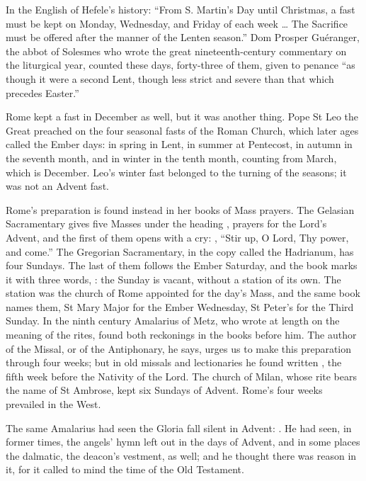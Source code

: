 \noindent In the English of Hefele's history: ``From S. Martin's Day until Christmas, a fast
must be kept on Monday, Wednesday, and Friday of each week \ldots{} The
Sacrifice must be offered after the manner of the Lenten season.'' Dom
Prosper Guéranger, the abbot of Solesmes who wrote the great nineteenth-century
commentary on the liturgical year, counted these days, forty-three of them,
given to penance ``as though it were a second Lent, though less strict and severe
than that which precedes Easter.''

Rome kept a fast in December as well, but it was another thing. Pope St Leo the
Great preached on the four seasonal fasts of the Roman Church, which later ages
called the Ember days: in spring in Lent, in summer at Pentecost, in autumn in
the seventh month, and in winter in the tenth month, counting from March, which
is December. Leo's winter fast belonged to the turning of the seasons; it was
not an Advent fast.

Rome's preparation is found instead in her books of Mass prayers. The Gelasian
Sacramentary gives five Masses under the heading , prayers for the Lord's Advent, and the first of them opens with a cry: , ``Stir up, O Lord, Thy power, and come.'' The Gregorian Sacramentary, in
the copy called the Hadrianum, has four Sundays. The last of them follows the
Ember Saturday, and the book marks it with three words, : the Sunday is vacant, without a station of its own. The station was the
church of Rome appointed for the day's Mass, and the same book names them, St
Mary Major for the Ember Wednesday, St Peter's for the Third Sunday. In the ninth century Amalarius of Metz, who wrote at length on the
meaning of the rites, found both reckonings in the books before him. The
author of the Missal, or of the Antiphonary, he says, urges us to make this
preparation through four weeks; but in old missals and lectionaries he found written
, the fifth week before the
Nativity of the Lord. The church of Milan, whose rite bears the name of St
Ambrose, kept six Sundays of Advent. Rome's four
weeks prevailed in the West.

The same Amalarius had seen the Gloria fall silent in Advent:
. He had seen, in former
times, the angels' hymn left out in the days of Advent, and in some places the
dalmatic, the deacon's vestment, as well; and he thought there was reason in
it, for it called to mind the time of the Old Testament.

